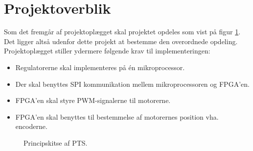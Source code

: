 \section{Projektoverblik}
\label{sec:projektoverblik}
Som det fremgår af projektoplægget skal projektet opdeles som vist på 
figur \ref{fig:overview_openloop_PTS}. 
Det ligger altså udenfor dette projekt at bestemme den overordnede opdeling.
Projektoplægget stiller ydermere følgende krav til implementeringen:
\begin{itemize}
\itemsep1pt
  \item Regulatorerne skal implementeres på én mikroprocessor.
  \item Der skal benyttes SPI kommunikation mellem mikroprocessoren og FPGA’en.
  \item FPGA’en skal styre PWM-signalerne til motorerne.
  \item FPGA’en skal benyttes til bestemmelse af motorernes position vha. encoderne.
\end{itemize}

\bigskip

\begin{figure}[!th]
\centering
\begin{tikzpicture}[auto, node distance=1cm,>=latex']

\end{tikzpicture}
\caption[Principskitse af PTS]{Principskitse af PTS.}
\label{fig:overview_openloop_PTS}
\end{figure}



